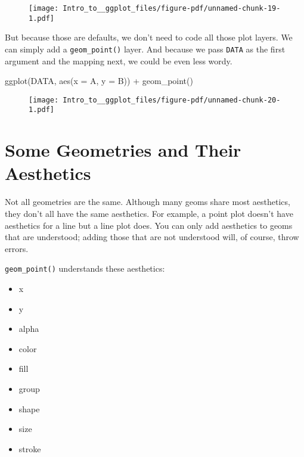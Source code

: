 \documentclass[
  letterpaper,
  DIV=11,
  numbers=noendperiod]{scrartcl}
\newenvironment{Shaded}{\begin{snugshade}}{\end{snugshade}}
\newcommand{\AttributeTok}[1]{\textcolor[rgb]{0.40,0.45,0.13}{#1}}
\newcommand{\FunctionTok}[1]{\textcolor[rgb]{0.28,0.35,0.67}{#1}}
\newcommand{\NormalTok}[1]{\textcolor[rgb]{0.00,0.23,0.31}{#1}}
\newcommand{\SpecialCharTok}[1]{\textcolor[rgb]{0.37,0.37,0.37}{#1}}
\providecommand{\tightlist}{%
  \setlength{\itemsep}{0pt}\setlength{\parskip}{0pt}}\usepackage{longtable,booktabs,array}
\begin{document}
\begin{figure}[H]

{\centering \texttt{[image: Intro\_to\_\_ggplot\_files/figure-pdf/unnamed-chunk-19-1.pdf]}

}

\end{figure}

But because those are defaults, we don't need to code all those plot
layers. We can simply add a \texttt{geom\_point()} layer. And because we
pass \texttt{DATA} as the first argument and the mapping next, we could
be even less wordy.

\begin{Shaded}
\begin{Highlighting}[]
\FunctionTok{ggplot}\NormalTok{(DATA, }\FunctionTok{aes}\NormalTok{(}\AttributeTok{x =}\NormalTok{ A, }\AttributeTok{y =}\NormalTok{ B)) }\SpecialCharTok{+}
  \FunctionTok{geom\_point}\NormalTok{()}
\end{Highlighting}
\end{Shaded}

\begin{figure}[H]

{\centering \texttt{[image: Intro\_to\_\_ggplot\_files/figure-pdf/unnamed-chunk-20-1.pdf]}

}

\end{figure}

\hypertarget{some-geometries-and-their-aesthetics}{%
\section{\texorpdfstring{\textbf{Some Geometries and Their
Aesthetics}}{Some Geometries and Their Aesthetics}}\label{some-geometries-and-their-aesthetics}}

Not all geometries are the same. Although many geoms share most
aesthetics, they don't all have the same aesthetics. For example, a
point plot doesn't have aesthetics for a line but a line plot does. You
can only add aesthetics to geoms that are understood; adding those that
are not understood will, of course, throw errors.

\texttt{geom\_point()} understands these aesthetics:

\begin{itemize}
\tightlist
\item
  x
\item
  y
\item
  alpha
\item
  color
\item
  fill
\item
  group
\item
  shape
\item
  size
\item
  stroke
\end{itemize}
\end{document}
